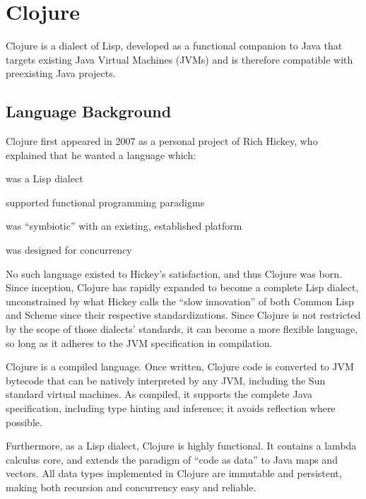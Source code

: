 \documentclass{article}
\begin{document}

\section{Clojure}

Clojure is a dialect of Lisp, developed as a functional companion to Java that targets existing Java Virtual Machines (JVMs) and is therefore compatible with preexisting Java projects. 

\subsection{Language Background}

Clojure first appeared in 2007 as a personal project of Rich Hickey, who explained that he wanted a language which:

\begin{itemize*}
\item was a Lisp dialect
\item supported functional programming paradigms
\item was ``symbiotic'' with an existing, established platform
\item was designed for concurrency
\end{itemize*}

No such language existed to Hickey's satisfaction, and thus Clojure was born. Since inception, Clojure has rapidly expanded to become a complete Lisp dialect, unconstrained by what Hickey calls the ``slow innovation''\cite{1} of both Common Lisp and Scheme since their respective standardizations. Since Clojure is not restricted by the scope of those dialects' standards, it can become a more flexible language, so long as it adheres to the JVM specification in compilation.

Clojure is a compiled language. Once written, Clojure code is converted to JVM bytecode that can be natively interpreted by any JVM, including the Sun standard virtual machines. As compiled, it supports the complete Java specification, including type hinting and inference; it avoids reflection where possible.

Furthermore, as a Lisp dialect, Clojure is highly functional. It contains a lambda calculus core, and extends the paradigm of ``code as data'' to Java maps and vectors. All data types implemented in Clojure are immutable and persistent, making both recursion and concurrency easy and reliable.
\end{document}
